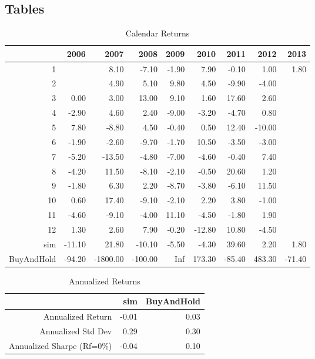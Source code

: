 \documentclass{article}
\begin{document}
\subsection{Tables}
\begin{table}[ht]
\begin{center}
\caption{Calendar Returns}
\begin{tabular}{rrrrrrrrr}
  \hline
 & 2006 & 2007 & 2008 & 2009 & 2010 & 2011 & 2012 & 2013 \\ 
  \hline
1 &  & 8.10 & -7.10 & -1.90 & 7.90 & -0.10 & 1.00 & 1.80 \\ 
  2 &  & 4.90 & 5.10 & 9.80 & 4.50 & -9.90 & -4.00 &  \\ 
  3 & 0.00 & 3.00 & 13.00 & 9.10 & 1.60 & 17.60 & 2.60 &  \\ 
  4 & -2.90 & 4.60 & 2.40 & -9.00 & -3.20 & -4.70 & 0.80 &  \\ 
  5 & 7.80 & -8.80 & 4.50 & -0.40 & 0.50 & 12.40 & -10.00 &  \\ 
  6 & -1.90 & -2.60 & -9.70 & -1.70 & 10.50 & -3.50 & -3.00 &  \\ 
  7 & -5.20 & -13.50 & -4.80 & -7.00 & -4.60 & -0.40 & 7.40 &  \\ 
  8 & -4.20 & 11.50 & -8.10 & -2.10 & -0.50 & 20.60 & 1.20 &  \\ 
  9 & -1.80 & 6.30 & 2.20 & -8.70 & -3.80 & -6.10 & 11.50 &  \\ 
  10 & 0.60 & 17.40 & -9.10 & -2.10 & 2.20 & 3.80 & -1.00 &  \\ 
  11 & -4.60 & -9.10 & -4.00 & 11.10 & -4.50 & -1.80 & 1.90 &  \\ 
  12 & 1.30 & 2.60 & 7.90 & -0.20 & -12.80 & 10.80 & -4.50 &  \\ 
  sim & -11.10 & 21.80 & -10.10 & -5.50 & -4.30 & 39.60 & 2.20 & 1.80 \\ 
  BuyAndHold & -94.20 & -1800.00 & -100.00 & Inf & 173.30 & -85.40 & 483.30 & -71.40 \\ 
   \hline
\end{tabular}
\end{center}
\end{table}%
\begin{table}[ht]
\begin{center}
\caption{Annualized Returns}
\begin{tabular}{rrr}
  \hline
 & sim & BuyAndHold \\ 
  \hline
Annualized Return & -0.01 & 0.03 \\ 
  Annualized Std Dev & 0.29 & 0.30 \\ 
  Annualized Sharpe (Rf=0\%) & -0.04 & 0.10 \\ 
   \hline
\end{tabular}
\end{center}
\end{table}%
\end{document}
